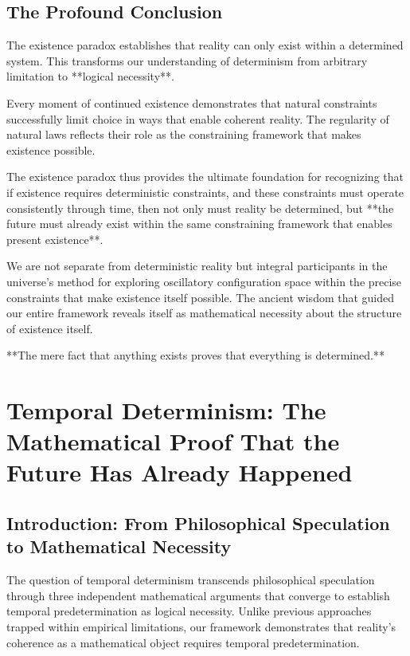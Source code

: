 \documentclass[11pt]{article}
\theoremstyle{remark}
\begin{document}
\subsection{The Profound Conclusion}

The existence paradox establishes that reality can only exist within a determined system. This transforms our understanding of determinism from arbitrary limitation to **logical necessity**.

Every moment of continued existence demonstrates that natural constraints successfully limit choice in ways that enable coherent reality. The regularity of natural laws reflects their role as the constraining framework that makes existence possible.

The existence paradox thus provides the ultimate foundation for recognizing that if existence requires deterministic constraints, and these constraints must operate consistently through time, then not only must reality be determined, but **the future must already exist within the same constraining framework that enables present existence**.

We are not separate from deterministic reality but integral participants in the universe's method for exploring oscillatory configuration space within the precise constraints that make existence itself possible. The ancient wisdom that guided our entire framework reveals itself as mathematical necessity about the structure of existence itself.

**The mere fact that anything exists proves that everything is determined.**

\section{Temporal Determinism: The Mathematical Proof That the Future Has Already Happened}

\subsection{Introduction: From Philosophical Speculation to Mathematical Necessity}

The question of temporal determinism transcends philosophical speculation through three independent mathematical arguments that converge to establish temporal predetermination as logical necessity. Unlike previous approaches trapped within empirical limitations, our framework demonstrates that reality's coherence as a mathematical object requires temporal predetermination.
\end{document}
